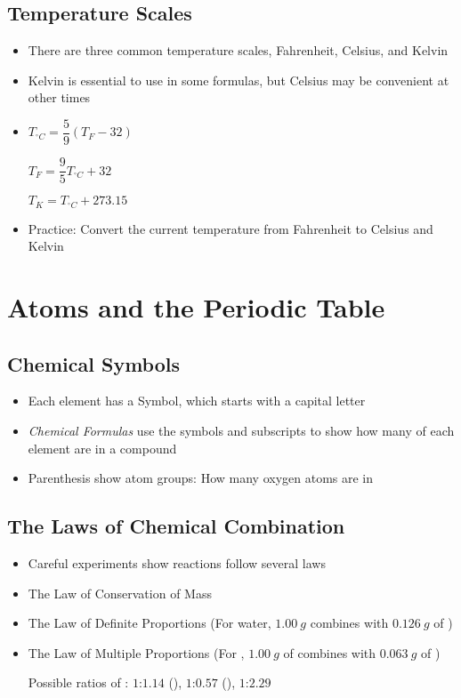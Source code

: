 \documentclass[12pt, openany, letterpaper]{memoir}
\begin{document}
\section{Temperature Scales}
\begin{itemize}
	\item There are three common temperature scales, Fahrenheit, Celsius, and Kelvin
	\item Kelvin is essential to use in some formulas, but Celsius may be convenient at other times
	\item $T_{^\circ C}=\dfrac{5}{9}\left(T_F-32\right)$
	
	$T_F=\dfrac{9}{5}T_{^\circ C}+32$
	
	$T_K=T_{^\circ C}+273.15$
	
	\item Practice: Convert the current temperature from Fahrenheit to Celsius and Kelvin
\end{itemize}

\chapter{Atoms and the Periodic Table}
\section{Chemical Symbols}
\begin{itemize}
	\item Each element has a Symbol, which starts with a capital letter
	\item \emph{Chemical Formulas} use the symbols and subscripts to show how many of each element are in a compound
	\item Parenthesis show atom groups: How many oxygen atoms are in 
\end{itemize}
\section{The Laws of Chemical Combination}
\begin{itemize}
	\item Careful experiments show reactions follow several laws	
	\item The Law of Conservation of Mass
	\item The Law of Definite Proportions (For water, $1.00~g$  combines with $0.126~g$ of )
	\item The Law of Multiple Proportions (For , $1.00~g$ of  combines with $0.063~g$ of )
	
	Possible ratios of : $1$:$1.14$ (), $1$:$0.57$ (), $1$:$2.29$ 
\end{itemize}
\end{document}
